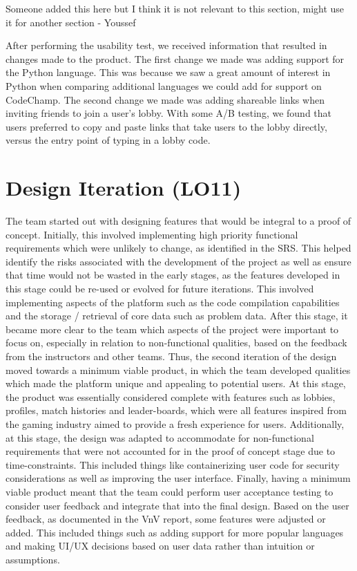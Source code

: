 \documentclass[12pt, titlepage]{article}
\begin{document}
Someone added this here but I think it is not relevant to this section, might use it for another section - Youssef 

After performing the usability test, we received information that resulted in changes made to the product. The first change we made was adding support for the Python language. This was because we saw a great amount of interest in Python when comparing additional languages we could add for support on CodeChamp. The second change we made was adding shareable links when inviting friends to join a user's lobby. With some A/B testing, we found that users preferred to copy and paste links that take users to the lobby directly, versus the entry point of typing in a lobby code. 



\section{Design Iteration (LO11)}


The team started out with designing features that would be integral to a proof of concept. Initially, this involved implementing high priority functional requirements which were unlikely to change, as identified in the SRS. This helped identify the risks associated with the development of the project as well as ensure that time would not be wasted in the early stages, as the features developed in this stage could be re-used or evolved for future iterations. This involved implementing aspects of the platform such as the code compilation capabilities and the storage / retrieval of core data such as problem data. After this stage, it became more clear to the team which aspects of the project were important to focus on, especially in relation to non-functional qualities, based on the feedback from the instructors and other teams. Thus, the second iteration of the design moved towards a minimum viable product, in which the team developed qualities which made the platform unique and appealing to potential users. At this stage, the product was essentially considered complete with features such as lobbies, profiles, match histories and leader-boards, which were all features inspired from the gaming industry aimed to provide a fresh experience for users. Additionally, at this stage, the design was adapted to accommodate for non-functional requirements that were not accounted for in the proof of concept stage due to time-constraints. This included things like containerizing user code for security considerations as well as improving the user interface. Finally, having a minimum viable product meant that the team could perform user acceptance testing to consider user feedback and integrate that into the final design. Based on the user feedback, as documented in the VnV report, some features were adjusted or added. This included things such as adding support for more popular languages and making UI/UX decisions based on user data rather than intuition or assumptions.
\end{document}
